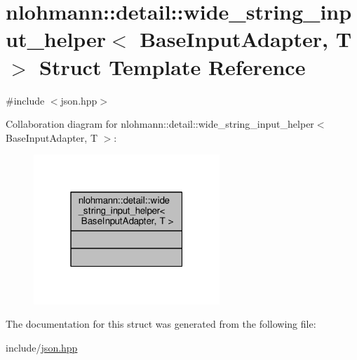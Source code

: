 \hypertarget{structnlohmann_1_1detail_1_1wide__string__input__helper}{}\section{nlohmann\+:\+:detail\+:\+:wide\+\_\+string\+\_\+input\+\_\+helper$<$ Base\+Input\+Adapter, T $>$ Struct Template Reference}
\label{structnlohmann_1_1detail_1_1wide__string__input__helper}


{\ttfamily \#include $<$json.\+hpp$>$}



Collaboration diagram for nlohmann\+:\+:detail\+:\+:wide\+\_\+string\+\_\+input\+\_\+helper$<$ Base\+Input\+Adapter, T $>$\+:
\nopagebreak
\begin{figure}[H]
\begin{center}
\leavevmode
\includegraphics[width=199pt]{structnlohmann_1_1detail_1_1wide__string__input__helper__coll__graph}
\end{center}
\end{figure}


The documentation for this struct was generated from the following file\+:\begin{DoxyCompactItemize}
\item 
include/\hyperlink{json_8hpp}{json.\+hpp}\end{DoxyCompactItemize}
